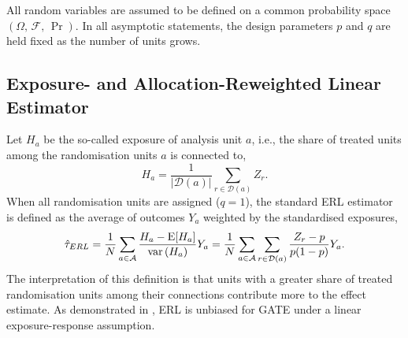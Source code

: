 \documentclass[sigconf,nonacm]{acmart}
\newcounter{assumption}
\newcommand{\E}{\mathrm E}
\DeclareMathOperator{\var}{var}
\begin{document}
All random variables are assumed to be defined on a common probability space $(\Omega,\,\mathcal F,\,\Pr)$. In all asymptotic statements, the design parameters $p$ and $q$ are held fixed as the number of units grows.

\subsection{Exposure- and Allocation-Reweighted Linear Estimator}\label{subsec:estimator}

Let $H_a$ be the so-called exposure of analysis unit $a$, i.e., the share of treated units among the randomisation units $a$ is connected to,
\begin{equation}\label{eq:Ha}
    H_a = \frac{1}{|\mathcal{D}(a)|}\sum_{r\in\mathcal{D}(a)} Z_r.
\end{equation}
When all randomisation units are assigned ($q=1$), the standard ERL estimator \cite{harshaw2023erl} is defined as the average of outcomes $Y_a$ weighted by the standardised exposures,
\begin{equation}{\label{eq:erl}}
    \hat\tau_{ERL} = \frac 1 N \sum_{a\in\mathcal A} \frac{H_a - \E[H_a]}{\var \left(H_a\right)}Y_a =\frac{1}{N}\sum_{a\in\mathcal A}\sum_{r\in\mathcal{D}(a)}\frac{Z_r - p}{p(1-p)}Y_a.
\end{equation}
The interpretation of this definition is that units with a greater share of treated randomisation units among their connections contribute more to the effect estimate. As demonstrated in \cite{harshaw2023erl}, ERL is unbiased for GATE under a linear exposure-response assumption.
\end{document}
